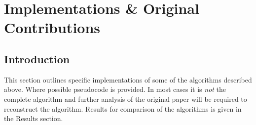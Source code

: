 \chapter{Implementations \& Original Contributions}

\section{Introduction}
This section outlines specific implementations of some of the algorithms described above. Where possible pseudocode is provided. In most cases it is \emph{not} the complete algorithm and further analysis of the original paper will be required to reconstruct the algorithm. Results for comparison of the algorithms is given in the Results section.





